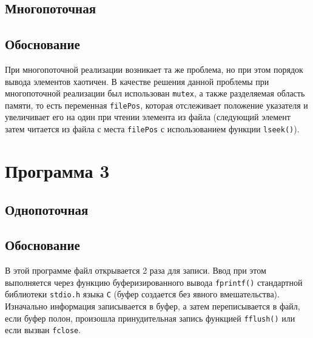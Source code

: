 \subsection{Многопоточная}

\begin{center}
    \captionsetup{justification=raggedright,singlelinecheck=off}
    
\end{center}


\subsection{Обоснование}

При многопоточной реализации возникает та же проблема, но при этом порядок вывода элементов хаотичен. В качестве решения данной проблемы при многопоточной реализации был использован \texttt{mutex}, а также разделяемая область памяти, то есть переменная \texttt{filePos}, которая отслеживает положение указателя и увеличивает его на один при чтении элемента из файла (следующий элемент затем читается из файла с места \texttt{filePos} с использованием функции \texttt{lseek()}).





\section{Программа 3}

\subsection{Однопоточная}

\begin{center}
    \captionsetup{justification=raggedright,singlelinecheck=off}
    
\end{center}


\subsection{Обоснование}

В этой программе файл открывается 2 раза для записи. Ввод при этом выполняется через функцию буферизированного вывода \texttt{fprintf()} стандартной библиотеки \texttt{stdio.h} языка \texttt{С} (буфер создается без явного вмешательства). Изначально информация записывается в буфер, а затем переписывается в файл, если буфер полон, произошла принудительная запись функцией \texttt{fflush()} или если вызван \texttt{fclose}.


